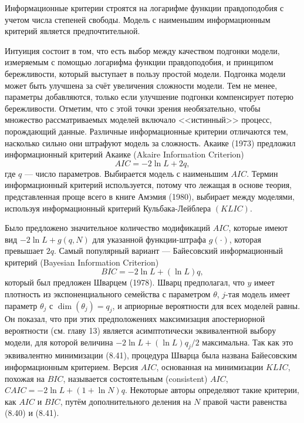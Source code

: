 Информационные критерии строятся на логарифме функции правдоподобия с учетом числа степеней свободы. Модель с наименьшим информационным критерий является предпочтительной.

Интуиция состоит в том, что есть выбор между качеством подгонки модели, измеряемым с помощью логарифма функции правдоподобия, и принципом бережливости, который выступает в пользу простой модели. Подгонка модели может быть улучшена за счёт увеличения сложности модели. Тем не менее, параметры добавляются, только если улучшение подгонки компенсирует потерю бережливости. Отметим, что с этой точки зрения необязательно, чтобы множество рассматриваемых моделей включало <<истинный>> процесс, порождающий данные. Различные информационные критерии отличаются тем, насколько сильно они штрафуют модель за сложность.
Акаике (1973) предложил информационный критерий Акаике (Akaire Information Criterion)
\begin{equation}
AIC = - 2\ln L + 2q,
\end{equation}
где $q$ --- число параметров. Выбирается модель с наименьшим $AIC$. Термин информационный критерий используется, потому что лежащая в основе теория, представленная проще всего в книге Амэмия (1980), выбирает между моделями, используя информационный критерий Кульбака-Лейблера $(KLIC)$.

Было предложено значительное количество модификаций $AIC$, которые имеют вид $ - 2\ln L + g(q, N)$ для указанной  функции-штрафа $g(\cdot)$, которая превышает $2q$. Самый популярный вариант --- Байесовский информационный критерий (Bayesian Information Criterion)
\begin{equation}
BIC = - 2\ln L + (\ln L)q,
\end{equation}
который был предложен Шварцем (1978). Шварц предполагал, что $y$ имеет плотность из экспоненциального семейства с параметром $\theta$, $j$-тая модель имеет параметр $\theta_j$ с $\dim(\theta_j) = q_j$, и априорные вероятности для всех моделей равны. Он показал, что при этих предположениях максимизация апостериорной вероятности (см. главу 13) является асимптотически эквивалентной выбору модели, для которой величина $- 2\ln L + (\ln L)q_j/2$ максимальна. Так как это эквивалентно минимизации (8.41), процедура Шварца была названа Байесовским информационным критерием. Версия $AIC$, основанная на минимизации $KLIC$, похожая на $BIC$, называется состоятельным (consistent) $AIC$, $CAIC = - 2\ln L + (1 + \ln N)q$. Некоторые авторы определяют такие критерии, как $AIC$ и $BIC$, путём дополнительного деления на $N$ правой части равенства (8.40) и (8.41).

